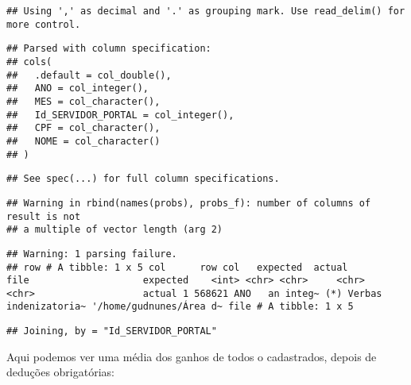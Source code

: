 \documentclass[]{article}
\newenvironment{Shaded}{\begin{snugshade}}{\end{snugshade}}
\newcommand{\KeywordTok}[1]{\textcolor[rgb]{0.13,0.29,0.53}{\textbf{#1}}}
\newcommand{\DataTypeTok}[1]{\textcolor[rgb]{0.13,0.29,0.53}{#1}}
\newcommand{\StringTok}[1]{\textcolor[rgb]{0.31,0.60,0.02}{#1}}
\newcommand{\OperatorTok}[1]{\textcolor[rgb]{0.81,0.36,0.00}{\textbf{#1}}}
\newcommand{\NormalTok}[1]{#1}
\begin{document}
\begin{verbatim}
## Using ',' as decimal and '.' as grouping mark. Use read_delim() for more control.
\end{verbatim}

\begin{verbatim}
## Parsed with column specification:
## cols(
##   .default = col_double(),
##   ANO = col_integer(),
##   MES = col_character(),
##   Id_SERVIDOR_PORTAL = col_integer(),
##   CPF = col_character(),
##   NOME = col_character()
## )
\end{verbatim}

\begin{verbatim}
## See spec(...) for full column specifications.
\end{verbatim}

\begin{verbatim}
## Warning in rbind(names(probs), probs_f): number of columns of result is not
## a multiple of vector length (arg 2)
\end{verbatim}

\begin{verbatim}
## Warning: 1 parsing failure.
## row # A tibble: 1 x 5 col      row col   expected  actual                    file                    expected    <int> <chr> <chr>     <chr>                     <chr>                   actual 1 568621 ANO   an integ~ (*) Verbas indenizatoria~ '/home/gudnunes/Área d~ file # A tibble: 1 x 5
\end{verbatim}

\begin{Shaded}
\end{Shaded}

\begin{verbatim}
## Joining, by = "Id_SERVIDOR_PORTAL"
\end{verbatim}

Aqui podemos ver uma média dos ganhos de todos o cadastrados, depois de
deduções obrigatórias:
\end{document}
